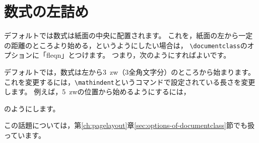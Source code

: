 \documentclass[class=jreport, crop=false, preview=false, dvipdfmx, fleqn]{standalone}
\begin{document}
\section{数式の左詰め}
デフォルトでは数式は紙面の中央に配置されます。
これを，紙面の左から一定の距離のところより始める，というようにしたい場合は，
\verb|\documentclass|のオプションに「fleqn」とつけます。
つまり，次のようにすればよいです。
デフォルトでは，数式は左から\SI{3}{zw}（3全角文字分）のところから始まります。
これを変更するには，\verb|\mathindent|というコマンドで設定されている長さを変更します。
例えば，\SI{5}{zw}の位置から始めるようにするには，
\begin{ITeX}
\setlength{\mathindent}{5zw}
\end{ITeX}
のようにします。

この話題については，第\ref{ch:pagelayout}章\ref{sec:options-of-documentclass}節でも扱っています。
\end{document}
